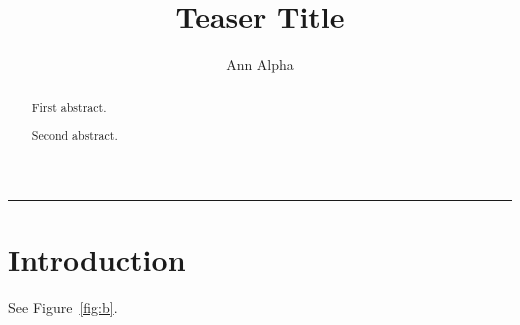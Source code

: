 \documentclass{article}
\begin{document}
\title{Teaser Title}
\author{Ann Alpha}
\maketitle
\begin{abstract}
First abstract.
\end{abstract}
\begin{center}
\rule{2cm}{1cm}
\label{fig:b}
\end{center}
\begin{abstract}
Second abstract.
\end{abstract}
\section{Introduction}
See Figure~\ref{fig:b}.
\end{document}
